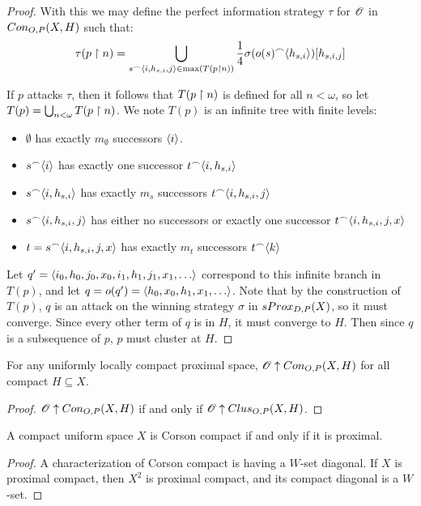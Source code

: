 \begin{proof}
  With this we may define the perfect information strategy $\tau$ for $\mathscr{O}$ in $Con_{O,P}(X,H)$ such that:
  \[
    \tau(p\restriction n) = \bigcup_{s^\frown\langle i,h_{s,i},j\rangle\in\max(T(p\restriction n))} \frac{1}{4}\sigma(o(s)^\frown\langle h_{s,i}\rangle)[h_{s,i,j}]
  \]

  If $p$ attacks $\tau$, then it follows that $T(p\restriction n)$ is defined for all $n<\omega$, so let $T(p)=\bigcup_{n<\omega} T(p\restriction n)$. We note $T(p)$ is an infinite tree with finite levels:
    \begin{itemize}
      \item $\emptyset$ has exactly $m_\emptyset$ successors $\langle i\rangle$.
      \item $s^\frown\langle i\rangle$ has exactly one successor $t^\frown\langle i,h_{s,i}\rangle$
      \item $s^\frown\langle i,h_{s,i}\rangle$ has exactly $m_s$ successors $t^\frown\langle i,h_{s,i},j\rangle$
      \item $s^\frown\langle i,h_{s,i},j\rangle$ has either no successors or exactly one successor $t^\frown\langle i,h_{s,i},j,x\rangle$
      \item $t=s^\frown\langle i,h_{s,i},j,x\rangle$ has exactly $m_t$ successors $t^\frown\langle k\rangle$
    \end{itemize}

  Let $q'=\<i_0,h_0,j_0,x_0,i_1,h_1,j_1,x_1,\dots\>$ correspond to this infinite branch in $T(p)$, and let $q=o(q')=\<h_0,x_0,h_1,x_1,\dots\>$. Note that by the construction of $T(p)$, $q$ is an attack on the winning strategy $\sigma$ in $sProx_{D,P}(X)$, so it must converge. Since every other term of $q$ is in $H$, it must converge to $H$. Then since $q$ is a subsequence of $p$, $p$ must cluster at $H$.
\end{proof}


\begin{corollary}
  For any uniformly locally compact proximal space, $\mathscr{O}\uparrow Con_{O,P}(X,H)$ for all compact $H\subseteq X$.
\end{corollary}

\begin{proof}
  $\mathscr{O} \uparrow Con_{O,P}(X,H)$ if and only if $\mathscr{O} \uparrow Clus_{O,P}(X,H)$.
\end{proof}

\begin{corollary}
  A compact uniform space $X$ is Corson compact if and only if it is proximal.
\end{corollary}

\begin{proof}
  A characterization of Corson compact is having a $W$-set diagonal. If $X$ is proximal compact, then $X^2$ is proximal compact, and its compact diagonal is a $W$-set.
\end{proof}









